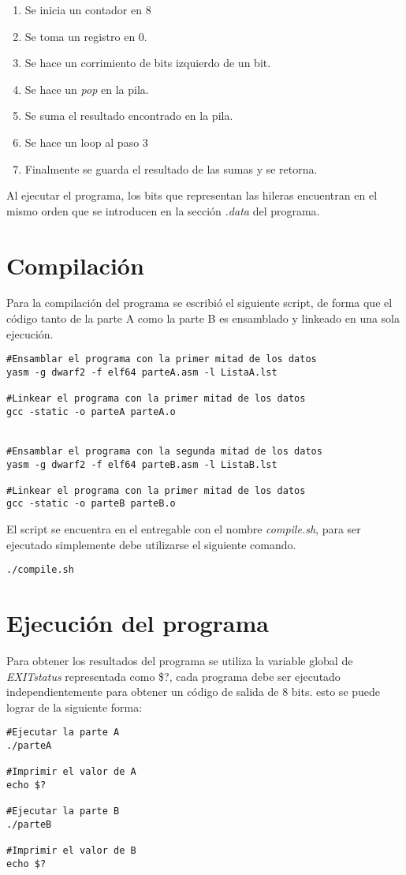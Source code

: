 \documentclass[8pt,letterpapper]{article}
\begin{document}
\begin{enumerate}
    \item Se inicia un contador en 8 %
    \item Se toma un registro en 0. %
    \item Se hace un corrimiento de bits izquierdo de un bit. %
    \item Se hace un \textit{pop} en la pila.    %
    \item Se suma el resultado encontrado en la pila. %
    \item Se hace un loop al paso 3
    \item Finalmente se guarda el resultado de las sumas y se retorna.
\end{enumerate}

Al ejecutar el programa, los bits que representan las hileras encuentran en el mismo orden que se introducen en la sección \textit{.data} del programa.

\section{Compilación}
    Para la compilación del programa se escribió el siguiente script, de forma que el código tanto de la parte A como la parte B es ensamblado y linkeado en una sola ejecución. 
    
\begin{lstlisting}
#Ensamblar el programa con la primer mitad de los datos
yasm -g dwarf2 -f elf64 parteA.asm -l ListaA.lst

#Linkear el programa con la primer mitad de los datos
gcc -static -o parteA parteA.o


#Ensamblar el programa con la segunda mitad de los datos
yasm -g dwarf2 -f elf64 parteB.asm -l ListaB.lst

#Linkear el programa con la primer mitad de los datos
gcc -static -o parteB parteB.o
\end{lstlisting}

El script se encuentra en el entregable con el nombre \textit{compile.sh}, para ser ejecutado simplemente debe utilizarse el siguiente comando. 
\begin{lstlisting}
./compile.sh
\end{lstlisting}

\section{Ejecución del programa}
Para obtener los resultados del programa se utiliza la variable global de \textit{EXIT\textunderscore status} representada como \$?, cada programa debe ser ejecutado independientemente para obtener un código de salida de 8 bits. esto se puede lograr de la siguiente forma:
\begin{lstlisting}
#Ejecutar la parte A
./parteA

#Imprimir el valor de A
echo $?

#Ejecutar la parte B
./parteB

#Imprimir el valor de B
echo $?
\end{lstlisting}
\end{document}
